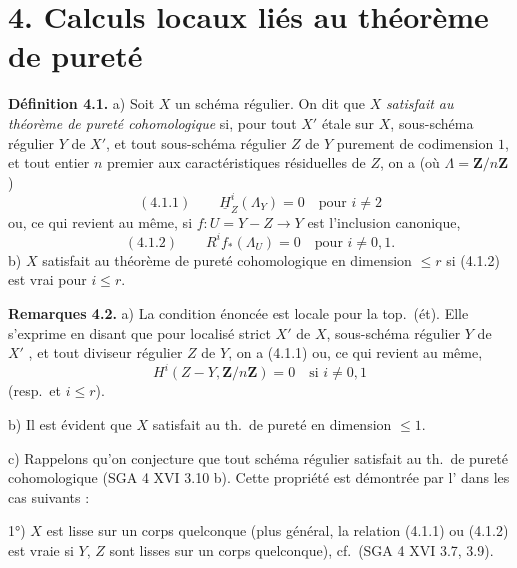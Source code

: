 \documentclass[11pt,a4paper]{article}
\begin{document}
\section{4. Calculs  locaux liés au théorème de pureté}



\textbf{Définition 4.1.} a) Soit $X$ un schéma régulier. On dit que $X$ \emph{satisfait au théorème de pureté cohomologique} si, pour tout \struck{\ill{}} $X'$ étale sur $X$, \ill{}  sous-schéma régulier $Y$ de $X'$, \struck{\ill{}} et tout sous-schéma régulier $Z$ de $Y$ purement de codimension $1$,  et tout entier $n$ premier aux caractéristiques résiduelles de $Z$, on a (où $\Lambda = \mathbf{Z}/n\mathbf{Z}$)
\[
(4.1.1) \qquad \underline{H}^i_Z(\Lambda_Y) = 0 \quad \text{pour } i \neq 2
\]
ou, ce qui revient au même, si $f : U = Y - Z \to Y$ est l'inclusion canonique,
\[
(4.1.2) \qquad R^i f_*(\Lambda_U) = 0 \quad \text{pour } i \neq 0, 1 .
\]
b)   $X$ satisfait au théorème de pureté cohomologique en dimension $\leq r$ si (4.1.2) est vrai pour $i \leq r$.

\textbf{Remarques 4.2.} a) La condition énoncée  \struck{\ill{}} est locale pour la top.\ (ét). Elle  s'exprime  en disant que pour  localisé strict $X'$ de $X$, \ill{} sous-schéma régulier $Y$ de $X'$ , et tout diviseur régulier $Z$ de $Y$, on a (4.1.1) ou, ce qui revient au même,
\[
H^i(Z - Y, \mathbf{Z}/n\mathbf{Z}) = 0 \quad \text{si } i \neq 0, 1
\]
(resp.\ et $i \leq r$). \struck{\ill{}}

b) Il est évident  que \struck{\ill{}} $X$ satisfait au th.\ de pureté  en dimension $\leq 1$.


c) Rappelons qu'on conjecture que tout schéma régulier satisfait au th.\ de pureté cohomologique (SGA 4 XVI 3.10 b). Cette propriété est démontrée par l' dans les cas suivants :

1°) $X$ est lisse sur un corps quelconque (plus général, la relation (4.1.1) ou (4.1.2) est vraie si $Y$, $Z$ sont lisses sur un corps quelconque), cf.\ (SGA 4 XVI 3.7, 3.9).
\end{document}
